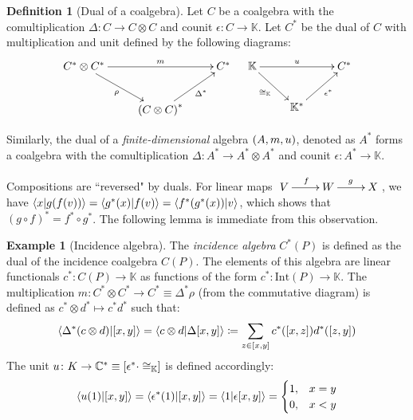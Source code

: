 \documentclass{article}
\theoremstyle{definition}
\newtheorem{Definition}{Definition}
\newtheorem*{Example*}{Example}
\theoremstyle{remark}
\theoremstyle{underline}
\theoremstyle{underline}
\begin{document}
 	\begin{Definition}[Dual of a coalgebra]
 		Let $C$ be a coalgebra with the comultiplication $\Delta \colon C \to C \otimes C$ and counit $\epsilon \colon C \to \mathbb K$. Let $C^*$ be the dual of $C$ with multiplication and unit defined by the following diagrams:
 		\begin{align*}
			\xymatrix{
				C^* \otimes C^* \ar[rr]^-{m} \ar[rd]_-{\rho} & & C^* \\
				& \pqty{C \otimes C}^* \ar[ru]_-{\Delta^*}
			} & &
			\xymatrix{
				\mathbb K \ar[rr]^-{u} \ar[rd]_-{\cong_{\mathbb K}} & & C^* \\
				& \mathbb K^* \ar[ru]_-{\epsilon^*}
			}
		\end{align*}
 	\end{Definition}
 	Similarly, the dual of a \emph{finite-dimensional} algebra $\pqty{A, m, u}$, denoted as $A^*$ forms a coalgebra with the comultiplication $\Delta \colon A^* \to A^* \otimes A^*$ and counit $\epsilon \colon A^* \to \mathbb K$.
 	
 	Compositions are ``reversed" by duals. For linear maps $\xymatrix{V \ar[r]^f & W \ar[r]^g & X}$, we have $\braket{x}{g(f(v))} = \braket{g^*(x)}{f(v)} = \braket{f^*(g^*(x))}{v}$, which shows that $(g \circ f)^* = f^* \circ g^*$. The following lemma is immediate from this observation.

 	\begin{Example*}[Incidence algebra]
 		The \emph{incidence algebra} $C^*(P)$ is defined as the dual of the incidence coalgebra $C(P)$. The elements of this algebra are linear functionals $c^* \colon C(P) \to \mathbb K$ as functions of the form $c^* \colon \mathrm{Int}(P) \to \mathbb K$. The multiplication $m \colon C^* \otimes C^* \to C^* \equiv \Delta^* \rho$ (from the commutative diagram) is defined as $c^* \otimes d^* \mapsto c^* d^*$ such that:
 		\begin{gather*}
 			\braket{\Delta^*\pqty{c \otimes d}}{[x,y]} = \braket{c \otimes d}{\Delta[x,y]} \coloneqq \sum_{z \in [x,y]} c^*\pqty{[x,z]}d^*\pqty{[z,y]}
 		\end{gather*}
 		The unit $u \colon K \to \mathbb C^* \equiv \bqty{\epsilon^* \cdot \cong_{\mathbb K}}$ is defined accordingly:
 		\begin{gather*}
 			\braket{u(1)}{[x,y]} = \braket{\epsilon^*(1)}{[x,y]} = \braket{1}{\epsilon[x,y]} =
 			\begin{cases}
 				1, & x = y \\
 				0, & x < y
 			\end{cases}
 		\end{gather*}
 	\end{Example*}
\end{document}
